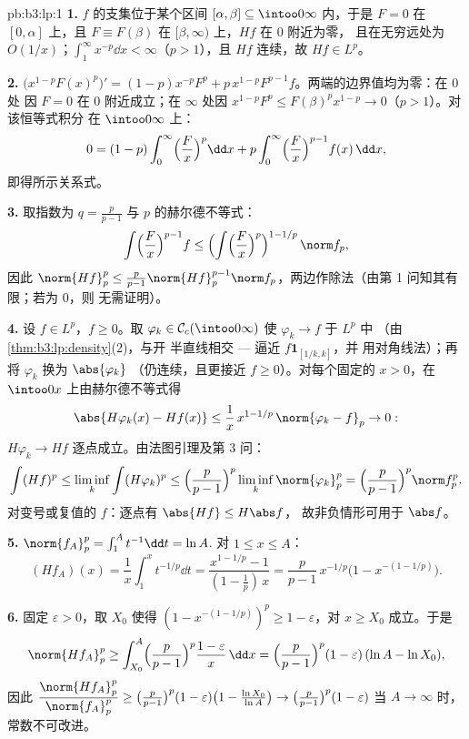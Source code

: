 \begin{solution}{pb:b3:lp:1}
\textbf{1.} $f$ 的支集位于某个区间 $[\alpha, \beta]
\subseteq \intoo0\infty$ 内，于是 $F = 0$ 在 $[0, \alpha]$ 上，且 $F
\equiv F(\beta)$ 在 $[\beta, \infty)$ 上，$Hf$ 在 $0$ 附近为零，
且在无穷远处为 $O(1/x)$；$\int_1^\infty x^{-p}\dd x <
\infty$（$p > 1$），且 $Hf$ 连续，故 $Hf \in L^p$。

\textbf{2.} $\bigl(x^{1-p}F(x)^p\bigr)' = (1-p)x^{-p}F^p +
p\,x^{1-p}F^{p-1}f$。两端的边界值均为零：在 $0$ 处
因 $F = 0$ 在 $0$ 附近成立；在 $\infty$ 处因 $x^{1-p}F^p \leq
F(\beta)^p x^{1-p} \to 0$（$p > 1$）。对该恒等式积分
在 $\intoo0\infty$ 上：
\[
0 = (1 - p)\int_0^\infty\Bigl(\frac Fx\Bigr)^p\dd x
+ p\int_0^\infty\Bigl(\frac Fx\Bigr)^{p-1}f(x)\,\dd x,
\]
即得所示关系式。

\textbf{3.} 取指数为 $q = \frac p{p-1}$ 与 $p$ 的赫尔德不等式：
\[
\int\Bigl(\frac Fx\Bigr)^{p-1}f
\leq \Bigl(\int\Bigl(\frac
Fx\Bigr)^{p}\Bigr)^{1 - 1/p}\,\norm f_p ,
\]
因此 $\norm{Hf}_p^p \leq \frac p{p-1}\norm{Hf}_p^{p-1}\norm
f_p$，两边作除法（由第 1 问知其有限；若为 $0$，则
无需证明）。

\textbf{4.} 设 $f \in L^p$，$f \geq 0$。取 $\varphi_k \in
\mathcal C_c(\intoo0\infty)$ 使 $\varphi_k \to f$ 于 $L^p$ 中
（由\cref{thm:b3:lp:density}(2)，与开
半直线相交 --- 逼近 $f\mathbf 1_{[1/k, k]}$，并
用对角线法）；再将 $\varphi_k$ 换为 $\abs{\varphi_k}$
（仍连续，且更接近 $f \geq 0$）。对每个固定的
$x > 0$，在 $\intoo0x$ 上由赫尔德不等式得
\[
\abs{H\varphi_k(x) - Hf(x)} \leq
\frac1x\,x^{1 - 1/p}\,\norm{\varphi_k - f}_p \to 0 :
\]
$H\varphi_k \to Hf$ 逐点成立。由法图引理及第 3 问：
\[
\int (Hf)^p \leq \liminf_k\int(H\varphi_k)^p
\leq \Bigl(\frac p{p-1}\Bigr)^p\liminf_k\norm{\varphi_k}_p^p
= \Bigl(\frac p{p-1}\Bigr)^p\norm f_p^p .
\]
对变号或复值的 $f$：逐点有 $\abs{Hf} \leq H\abs f$，
故非负情形可用于 $\abs f$。

\textbf{5.} $\norm{f_A}_p^p = \int_1^A t^{-1}\dd t = \ln A$.
对 $1 \leq x \leq A$：
\[
(Hf_A)(x) = \frac1x\int_1^x t^{-1/p}\dd t
= \frac{x^{1 - 1/p} - 1}{(1 - \tfrac1p)\,x}
= \frac p{p-1}\,x^{-1/p}\bigl(1 - x^{-(1 - 1/p)}\bigr).
\]

\textbf{6.} 固定 $\varepsilon > 0$，取 $X_0$ 使得 $(1 -
x^{-(1-1/p)})^p \geq 1 - \varepsilon$，对 $x \geq X_0$ 成立。于是
\[
\norm{Hf_A}_p^p \geq \int_{X_0}^A\Bigl(\frac
p{p-1}\Bigr)^p\frac{1 - \varepsilon}{x}\,\dd x
= \Bigl(\frac p{p-1}\Bigr)^p(1 - \varepsilon)\,(\ln A - \ln
X_0),
\]
因此 $\dfrac{\norm{Hf_A}_p^p}{\norm{f_A}_p^p} \geq \bigl(\frac
p{p-1}\bigr)^p(1 - \varepsilon)\bigl(1 - \frac{\ln X_0}{\ln
A}\bigr) \to \bigl(\frac p{p-1}\bigr)^p(1 - \varepsilon)$ 当
$A \to \infty$ 时，常数不可改进。


\end{solution}
